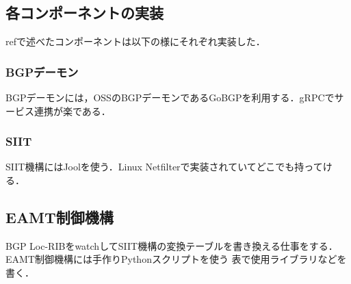 \subsection{各コンポーネントの実装}
refで述べたコンポーネントは以下の様にそれぞれ実装した．
\subsubsection{BGPデーモン}
BGPデーモンには，OSSのBGPデーモンであるGoBGPを利用する．gRPCでサービス連携が楽である．
\subsubsection{SIIT}
SIIT機構にはJoolを使う．Linux Netfilterで実装されていてどこでも持ってける．
\subsection{EAMT制御機構}
BGP Loc-RIBをwatchしてSIIT機構の変換テーブルを書き換える仕事をする．
EAMT制御機構には手作りPythonスクリプトを使う
表で使用ライブラリなどを書く．


